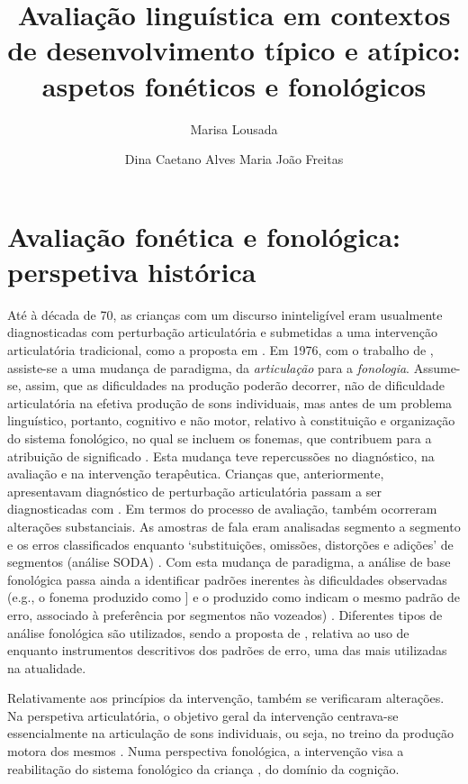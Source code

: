 \documentclass[output=paper]{LSP/langsci}
\author{Marisa Lousada\affiliation{Universidade de Aveiro e CINTESIS.UA}\and 
Dina Caetano
Alves\affiliation{Instituto Politécnico de Setúbal e Centro de Linguística da Universidade de Lisboa}\lastand 
Maria João Freitas\affiliation{Universidade de Lisboa, Faculdade de Letras, Centro de Linguística}
}
\title{Avaliação linguística em contextos de desenvolvimento típico e atípico: aspetos fonéticos e fonológicos}
\begin{document}
\section{Avaliação fonética e fonológica: perspetiva histórica}
\label{sec:lousada_avaliacao}

Até à década de 70, as crianças com um discurso ininteligível eram usualmente diagnosticadas com perturbação articulatória e submetidas a uma intervenção articulatória tradicional, como a proposta em \citet{vanriper1939}. Em 1976, com o trabalho de \cite{ingram1976}, assiste-se a uma mudança de paradigma, da \textit{articulação} para a \textit{fonologia}. Assume-se, assim, que as dificuldades na produção poderão decorrer, não de dificuldade articulatória na efetiva produção de sons individuais, mas antes de um problema linguístico, portanto, cognitivo e não motor, relativo à constituição e organização do sistema fonológico, no qual se incluem os fonemas, que contribuem para a atribuição de significado \citep{baker2006}. Esta mudança teve repercussões no diagnóstico, na avaliação e na intervenção terapêutica. Crianças que, anteriormente, apresentavam diagnóstico de perturbação articulatória passam a ser diagnosticadas com . Em termos do processo de avaliação, também ocorreram alterações substanciais. As amostras de fala eram analisadas segmento a segmento e os erros classificados enquanto `substituições, omissões, distorções e adições' de segmentos (análise SODA) \citep{bowen2015}. Com esta mudança de paradigma, a análise de base fonológica passa ainda a identificar padrões inerentes às dificuldades observadas (e.g., o fonema  produzido como \textipa{[s}] e o  produzido como \textipa{[S]} indicam o mesmo padrão de erro, associado à preferência por segmentos não vozeados) \citep{baker2006}. Diferentes tipos de análise fonológica são utilizados, sendo a proposta de \cite{stampe1979}, relativa ao uso de  enquanto instrumentos descritivos dos padrões de erro, uma das mais utilizadas na atualidade.

Relativamente aos princípios da intervenção, também se verificaram alterações. Na perspetiva articulatória, o objetivo geral da intervenção centrava-se essencialmente na articulação de sons individuais, ou seja, no treino da produção motora dos mesmos \citep{vanriperemerick1984}. Numa perspectiva fonológica, a intervenção visa a reabilitação do sistema fonológico da criança \citep{baker2006}, do domínio da cognição. 
\end{document}
